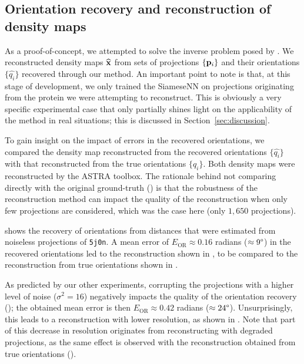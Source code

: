 
\subsection{Orientation recovery and reconstruction of density maps}\label{sec:results:orientation-recovery:reconstruction}

 As a proof-of-concept, we attempted to solve the inverse problem posed by .
We reconstructed density maps $\widehat{\mathbf{x}}$ from sets of projections $\{ \mathbf{p}_i \}$ and their orientations $\{ \widehat{q_i} \}$ recovered through our method.
An important point to note is that, at this stage of development, we only trained the SiameseNN on projections originating from the protein we were attempting to reconstruct. This is obviously a very specific experimental case that only partially shines light on the applicability of the method in real situations; this is discussed in Section~\ref{sec:discussion}. 

To gain insight on the impact of errors in the recovered orientations, we compared the density map reconstructed from the recovered orientations $\{ \widehat{q_i} \}$ with that reconstructed from the true orientations $\{ q_i \}$. Both density maps were reconstructed by the ASTRA toolbox. The rationale behind not comparing directly with the original ground-truth () is that the robustness of the reconstruction method can impact the quality of the reconstruction when only few projections are considered, which was the case here (only $1,650$ projections). 

 shows the recovery of orientations from distances that were estimated from noiseless projections of \texttt{5j0n}.
A mean error of $E_\text{OR} \approx 0.16$ radians ($\approx 9\degree$) in the recovered orientations led to the reconstruction shown in , to be compared to the reconstruction from true orientations shown in . 

As predicted by our other experiments, corrupting the projections with a higher level of noise ($\sigma^2=16$) negatively impacts the quality of the orientation recovery (); the obtained mean error is then $E_\text{OR} \approx 0.42$ radians ($\approx 24\degree$).
Unsurprisingly, this leads to a reconstruction with lower resolution, as shown in . Note that part of this decrease in resolution originates from reconstructing with degraded projections, as the same effect is observed with the reconstruction obtained from true orientations ().

